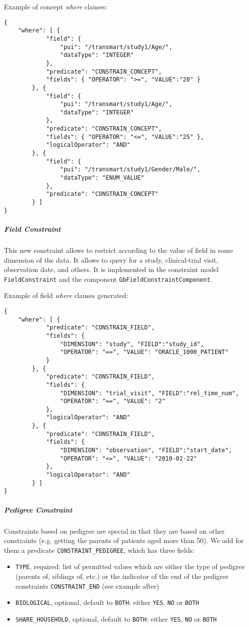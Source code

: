 Example of concept \emph{where} clauses:
\begin{verbatim}
{
    "where": [ {
            "field": {
                "pui": "/transmart/study1/Age/",
                "dataType": "INTEGER"
            },
            "predicate": "CONSTRAIN_CONCEPT", 
            "fields": { "OPERATOR": ">=", "VALUE":"20" } 
        }, {
            "field": {
                "pui": "/transmart/study1/Age/",
                "dataType": "INTEGER"
            },
            "predicate": "CONSTRAIN_CONCEPT", 
            "fields": { "OPERATOR": "<=", "VALUE":"25" },
            "logicalOperator": "AND"
        }, {
            "field": {
                "pui": "/transmart/study1/Gender/Male/",
                "dataType": "ENUM_VALUE"
            },
            "predicate": "CONSTRAIN_CONCEPT"
        } ]
}
\end{verbatim}

\subparagraph{Field Constraint}
This new constraint allows to restrict according to the value of field in some dimension of the data.
It allows to query for a study, clinical-trial visit, observation date, and others.
It is implemented in the constraint model \verb|FieldConstraint| and the component \verb|GbFieldConstraintComponent|.

Example of field \emph{where} clauses generated:
\begin{verbatim}
{
    "where": [ {
            "predicate": "CONSTRAIN_FIELD", 
            "fields": { 
                "DIMENSION": "study", "FIELD":"study_id", 
                "OPERATOR": "==", "VALUE": "ORACLE_1000_PATIENT" 
            } 
        }, {
            "predicate": "CONSTRAIN_FIELD", 
            "fields": { 
                "DIMENSION": "trial_visit", "FIELD":"rel_time_num", 
                "OPERATOR": "==", "VALUE": "2" 
            },
            "logicalOperator": "AND"
        }, {
            "predicate": "CONSTRAIN_FIELD", 
            "fields": { 
                "DIMENSION": "observation", "FIELD":"start_date", 
                "OPERATOR": "<=", "VALUE": "2010-02-22" 
            },
            "logicalOperator": "AND"
        } ]
}
\end{verbatim}

\subparagraph{Pedigree Constraint}
Constraints based on pedigree are special in that they are based on other constraints (e.g. getting the parents of patients aged more than 50).
We add for them a predicate \verb|CONSTRAINT_PEDIGREE|, which has three fields:
\begin{itemize}
    \item \verb|TYPE|, required: list of permitted values which are either the type of pedigree (parents of, siblings of, etc.) or the indicator of the end of the pedigree constraints \verb|CONSTRAINT_END| (see example after)
    \item \verb|BIOLOGICAL|, optional, default to \verb|BOTH|: either \verb|YES|, \verb|NO| or \verb|BOTH|
    \item \verb|SHARE_HOUSEHOLD|, optional, default to \verb|BOTH|: either \verb|YES|, \verb|NO| or \verb|BOTH|
\end{itemize}

